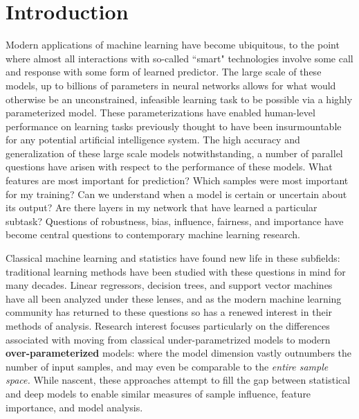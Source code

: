 \chapter{Introduction} \label{chap:intro} 

Modern applications of machine learning have become ubiquitous, 
to the point where almost all
interactions with so-called ``smart"
technologies involve some
call and response with some form of
learned predictor.
The large scale of these models,
up to billions of parameters in neural networks
allows for what would otherwise
be an unconstrained, infeasible learning task
to be possible via a highly parameterized model.
These parameterizations have enabled 
human-level performance on learning tasks
previously thought to have been insurmountable
for any potential artificial intelligence system.
The high accuracy and generalization of these large scale models notwithstanding,
a number of parallel questions have arisen with respect to 
the performance of these models.
What features are most important for prediction?
Which samples were most important for my training?
Can we understand when a model is certain or uncertain about its output?
Are there layers in my network that have learned a particular subtask?
Questions of robustness, bias, influence, fairness, and importance have become central questions to contemporary machine learning research.

Classical machine learning and statistics have found new life in these subfields: traditional learning methods 
have been studied with these questions in mind for many decades.
Linear regressors, decision trees, and support vector machines
have all been analyzed under these lenses,
and as the modern machine learning community
has returned to these questions
so has a renewed interest in their methods of analysis.
Research interest focuses
particularly on the differences
associated with moving from classical under-parametrized models to
modern \textbf{over-parameterized} models: where
the model dimension vastly outnumbers the number
of input samples, and may even be comparable to 
the \textit{entire sample space.}
While nascent, these approaches 
attempt to fill the gap between
statistical and deep models to enable similar measures of sample influence, feature importance, and model analysis. 



